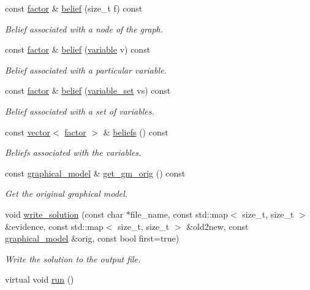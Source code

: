 \begin{DoxyCompactItemize}
const \hyperlink{classmerlin_1_1factor}{factor} \& \hyperlink{classmerlin_1_1wmb_aeb4e3096861b442f85ad8d1344172d18}{belief} (size\+\_\+t f) const 
\begin{DoxyCompactList}\small\item\em Belief associated with a node of the graph. \end{DoxyCompactList}\item 
const \hyperlink{classmerlin_1_1factor}{factor} \& \hyperlink{classmerlin_1_1wmb_a93588ec46d0cc1e54179ce8555862941}{belief} (\hyperlink{classmerlin_1_1variable}{variable} v) const 
\begin{DoxyCompactList}\small\item\em Belief associated with a particular variable. \end{DoxyCompactList}\item 
const \hyperlink{classmerlin_1_1factor}{factor} \& \hyperlink{classmerlin_1_1wmb_afe50fb8a9334a9f8b4653a75f20abd30}{belief} (\hyperlink{classmerlin_1_1variable__set}{variable\+\_\+set} vs) const 
\begin{DoxyCompactList}\small\item\em Belief associated with a set of variables. \end{DoxyCompactList}\item 
const \hyperlink{classmerlin_1_1vector}{vector}$<$ \hyperlink{classmerlin_1_1factor}{factor} $>$ \& \hyperlink{classmerlin_1_1wmb_ab433dc54ee1777fa163af30aa71bde3d}{beliefs} () const 
\begin{DoxyCompactList}\small\item\em Beliefs associated with the variables. \end{DoxyCompactList}\item 
const \hyperlink{classmerlin_1_1graphical__model}{graphical\+\_\+model} \& \hyperlink{classmerlin_1_1wmb_a5060018ee2950dac945e4efcb21a36d1}{get\+\_\+gm\+\_\+orig} () const \hypertarget{classmerlin_1_1wmb_a5060018ee2950dac945e4efcb21a36d1}{}\label{classmerlin_1_1wmb_a5060018ee2950dac945e4efcb21a36d1}

\begin{DoxyCompactList}\small\item\em Get the original graphical model. \end{DoxyCompactList}\item 
void \hyperlink{classmerlin_1_1wmb_adfc9d5e1b077918f71c17f8b0e56a13a}{write\+\_\+solution} (const char $\ast$file\+\_\+name, const std\+::map$<$ size\+\_\+t, size\+\_\+t $>$ \&evidence, const std\+::map$<$ size\+\_\+t, size\+\_\+t $>$ \&old2new, const \hyperlink{classmerlin_1_1graphical__model}{graphical\+\_\+model} \&orig, const bool first=true)
\begin{DoxyCompactList}\small\item\em Write the solution to the output file. \end{DoxyCompactList}\item 
virtual void \hyperlink{classmerlin_1_1wmb_acdbdfbded7a99152f8e7215c57cf1ab5}{run} ()\hypertarget{classmerlin_1_1wmb_acdbdfbded7a99152f8e7215c57cf1ab5}{}\label{classmerlin_1_1wmb_acdbdfbded7a99152f8e7215c57cf1ab5}


\end{DoxyCompactItemize}
